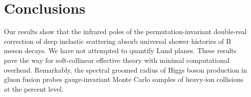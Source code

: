 \section{Conclusions}\label{sec:conclusions}

Our results show that the infrared poles of the permutation-invariant
double-real correction of deep inelastic scattering absorb universal
shower histories of B meson decays. We have not attempted to quantify
Lund planes. These results pave the way for soft-collinear effective
theory with minimal computational overhead. Remarkably, the spectral
groomed radius of Higgs boson production in gluon fusion probes
gauge-invariant Monte Carlo samples of heavy-ion collisions at the
percent level.

